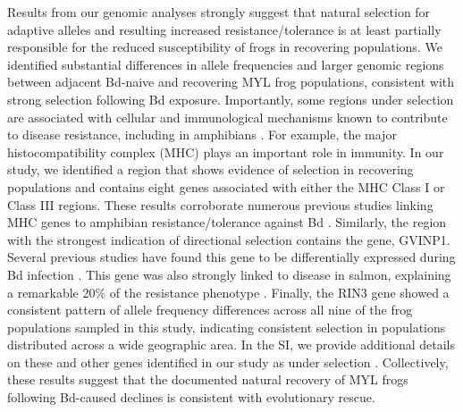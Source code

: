 \documentclass[9pt,twocolumn,twoside,lineno]{pnas-new}
\begin{document}
Results from our genomic analyses strongly suggest that natural
selection for adaptive alleles and resulting increased
resistance/tolerance is at least partially responsible for the reduced
susceptibility of frogs in recovering populations. We identified
substantial differences in allele frequencies and larger genomic regions
between adjacent Bd-naive and recovering MYL frog populations,
consistent with strong selection following Bd exposure. Importantly,
some regions under selection are associated with cellular and
immunological mechanisms known to contribute to disease resistance,
including in amphibians \citep{zamudio2020}. For example, the major
histocompatibility complex (MHC) plays an important role in immunity. In
our study, we identified a region that shows evidence of selection in
recovering populations and contains eight genes associated with either
the MHC Class I or Class III regions. These results corroborate numerous
previous studies linking MHC genes to amphibian resistance/tolerance
against Bd \citep[e.g.,][]{savage2011, bataille2015}. Similarly, the
region with the strongest indication of directional selection contains
the gene, GVINP1. Several previous studies have found this gene to be
differentially expressed during Bd infection
\citep[e.g.,][]{grogan2018, ellison2014}. This gene was also strongly
linked to disease in salmon, explaining a remarkable 20\% of the
resistance phenotype \citep{robledo2020, robledo2018}. Finally, the RIN3
gene showed a consistent pattern of allele frequency differences across
all nine of the frog populations sampled in this study, indicating
consistent selection in populations distributed across a wide geographic
area. In the SI, we provide additional details on these and other genes
identified in our study as under selection . Collectively, these results
suggest that the documented natural recovery of MYL frogs following
Bd-caused declines \citep{knapp2016} is consistent with evolutionary
rescue.
\end{document}
